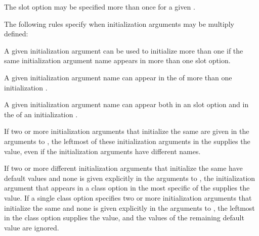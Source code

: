 \endsubsection%

     
The  slot option may be specified more than
once for a given .

The following rules specify when initialization arguments may be
multiply defined:

\beginlist

\itemitem{\bull} A given initialization argument can be used to
initialize more than one  if the same initialization argument name
appears in more than one  slot option.

\itemitem{\bull} A given initialization argument name can appear 
in the  of more than one initialization .

\itemitem{\bull} A given initialization argument name can
appear both in an  slot option and 
in the 
of an initialization .

\endlist


If two or more initialization arguments that initialize the same
 are given in the arguments to , the
leftmost of these initialization arguments in the  supplies the value, even if the initialization arguments
have different names.

If two or more different initialization arguments that initialize the
same  have default values and none is given explicitly in the
arguments to , the initialization argument that
appears in a  class option in the most specific
of the  supplies the value. If a single
 class option specifies two or more initialization
arguments that initialize the same  and none is given
explicitly in the arguments to , the leftmost in
the  class option supplies the value, and the
values of the remaining default value  are ignored.

